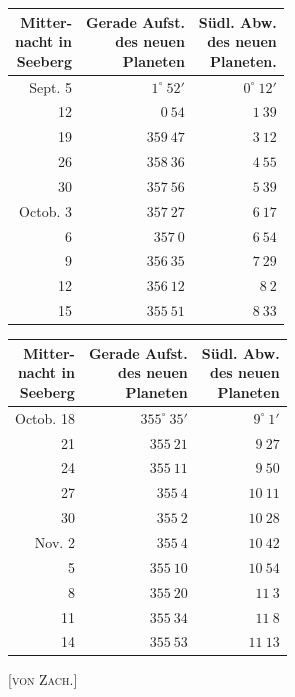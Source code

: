 \begin{center}
\begingroup\fontsize{9}{11}\selectfont\setlength{\tabcolsep}{3pt}\renewcommand{\arraystretch}{1.12}
\begin{tabular}{r|r|r}
\shortstack{Mitter-\\nacht in\\Seeberg} & \shortstack{Gerade Aufst.\\des neuen\\Planeten} & \shortstack{Südl. Abw.\\des neuen\\Planeten.} \\ \hline
Sept. 5 & $1^\circ\ 52'$ & $0^\circ\ 12'$ \\
12 & $0\ 54$ & $1\ 39$ \\
19 & $359\ 47$ & $3\ 12$ \\
26 & $358\ 36$ & $4\ 55$ \\
30 & $357\ 56$ & $5\ 39$ \\
Octob. 3 & $357\ 27$ & $6\ 17$ \\
6 & $357\ 0$ & $6\ 54$ \\
9 & $356\ 35$ & $7\ 29$ \\
12 & $356\ 12$ & $8\ 2$ \\
15 & $355\ 51$ & $8\ 33$ \\
\end{tabular}\endgroup
\end{center}
\begin{center}
\begingroup\fontsize{9}{11}\selectfont\setlength{\tabcolsep}{3pt}\renewcommand{\arraystretch}{1.12}
\begin{tabular}{r|r|r}
\shortstack{Mitter-\\nacht in\\Seeberg} & \shortstack{Gerade Aufst.\\des neuen\\Planeten} & \shortstack{Südl. Abw.\\des neuen\\Planeten} \\ \hline
Octob. 18 & $355^\circ\ 35'$ & $9^\circ\ 1'$ \\
21 & $355\ 21$ & $9\ 27$ \\
24 & $355\ 11$ & $9\ 50$ \\
27 & $355\ 4$ & $10\ 11$ \\
30 & $355\ 2$ & $10\ 28$ \\
Nov. 2 & $355\ 4$ & $10\ 42$ \\
5 & $355\ 10$ & $10\ 54$ \\
8 & $355\ 20$ & $11\ 3$ \\
11 & $355\ 34$ & $11\ 8$ \\
14 & $355\ 53$ & $11\ 13$ \\
\end{tabular}\endgroup
\end{center}

\hfill[\textsc{von Zach.}]
